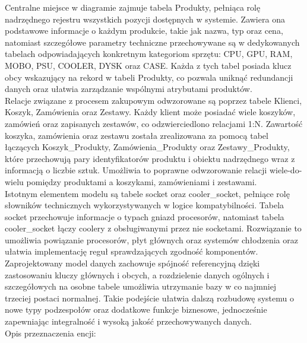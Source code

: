 \documentclass[a4paper,twoside,12pt]{book}
\begin{document}
Centralne miejsce w diagramie zajmuje tabela Produkty, pełniąca rolę nadrzędnego 
rejestru wszystkich pozycji dostępnych w systemie. Zawiera ona podstawowe 
informacje o każdym produkcie, takie jak nazwa, typ oraz cena, natomiast 
szczegółowe parametry techniczne przechowywane są w dedykowanych tabelach 
odpowiadających konkretnym kategoriom sprzętu: CPU, GPU, RAM, MOBO, PSU, 
COOLER, DYSK oraz CASE. Każda z tych tabel posiada klucz obcy wskazujący na 
rekord w tabeli Produkty, co pozwala uniknąć redundancji danych oraz ułatwia 
zarządzanie wspólnymi atrybutami produktów.
\\
Relacje związane z procesem zakupowym odwzorowane są poprzez tabele Klienci, 
Koszyk, Zamówienia oraz Zestawy. Każdy klient może posiadać wiele koszyków, 
zamówień oraz zapisanych zestawów, co odzwierciedlono relacjami 1:N. 
Zawartość koszyka, zamówienia oraz zestawu została zrealizowana za pomocą tabel 
łączących Koszyk\_Produkty, Zamówienia\_Produkty oraz Zestawy\_Produkty, które 
przechowują pary identyfikatorów produktu i obiektu nadrzędnego wraz z 
informacją o liczbie sztuk. Umożliwia to poprawne odwzorowanie relacji 
wiele-do-wielu pomiędzy produktami a koszykami, zamówieniami i zestawami.
\vspace{0.5cm}
\\
Istotnym elementem modelu są tabele socket oraz cooler\_socket, pełniące rolę 
słowników technicznych wykorzystywanych w logice kompatybilności. Tabela 
socket przechowuje informacje o typach gniazd procesorów, natomiast tabela 
cooler\_socket łączy coolery z obsługiwanymi przez nie socketami. Rozwiązanie to 
umożliwia powiązanie procesorów, płyt głównych oraz systemów chłodzenia oraz 
ułatwia implementację reguł sprawdzających zgodność komponentów.
\vspace{0.5cm}
\\
Zaprojektowany model danych zachowuje spójność referencyjną dzięki zastosowaniu 
kluczy głównych i obcych, a rozdzielenie danych ogólnych i szczegółowych na 
osobne tabele umożliwia utrzymanie bazy w co najmniej trzeciej postaci normalnej. 
Takie podejście ułatwia dalszą rozbudowę systemu o nowe typy podzespołów oraz 
dodatkowe funkcje biznesowe, jednocześnie zapewniając integralność i wysoką 
jakość przechowywanych danych.
\vspace{0.5cm}
\\
Opis przeznaczenia encji:
\end{document}
